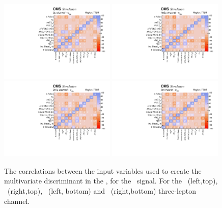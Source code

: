 \begin{figure}[htbp]
	\centering
	\includegraphics[width=0.49\textwidth]{6_Search/Figures/PlotsTechnics/correlationsigZcttoppairuuu}
	\includegraphics[width=0.49\textwidth]{6_Search/Figures/PlotsTechnics/correlationsigZcttoppairuue}
	\includegraphics[width=0.49\textwidth]{6_Search/Figures/PlotsTechnics/correlationsigZcttoppaireeu}
	\includegraphics[width=0.49\textwidth]{6_Search/Figures/PlotsTechnics/correlationsigZcttoppaireee}
	\caption{The correlations between the input variables used to create the multivariate discriminant in the \TTSR, for the \Zct\ signal. For the \mumumu\ (left,top), \emumu\ (right,top), \eemu\ (left, bottom) and \eee\ (right,bottom) three-lepton channel.}
	\label{fig:correlationsigzcttoppaier}
\end{figure}

